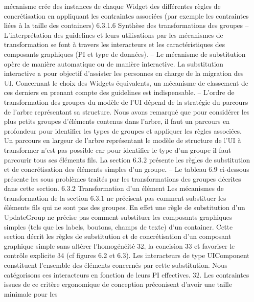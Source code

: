 \documentclass{article}
\begin{document}
m\'{e}canisme cr\'{e}e des instances de chaque Widget des diff\'{e}rentes r\`{e}gles de concr\'{e}tisation en appliquant
les contraintes associ\'{e}es (par exemple les contraintes li\'{e}es \`{a} la taille des containers)
6.3.1.6
Synth\`{e}se des transformations des groupes
– L’interpr\'{e}tation des guidelines et leurs utilisations par les m\'{e}canismes de transformation se
font \`{a} travers les interacteurs et les caract\'{e}ristiques des composants graphiques (PI et type de
donn\'{e}es).
– Le m\'{e}canisme de substitution op\`{e}re de mani\`{e}re automatique ou de mani\`{e}re interactive. La
substitution interactive a pour objectif d’assister les personnes en charge de la migration des
UI. Concernant le choix des Widgets \'{e}quivalents, un m\'{e}canisme de classement de ces derniers
en prenant compte des guidelines est indispensable.
– L’ordre de transformation des groupes du mod\`{e}le de l’UI d\'{e}pend de la strat\'{e}gie du parcours
de l’arbre repr\'{e}sentant sa structure. Nous avons remarqu\'{e} que pour consid\'{e}rer les plus petits
groupes d’\'{e}l\'{e}ments contenus dans l’arbre, il faut un parcours en profondeur pour identiﬁer les
types de groupes et appliquer les r\`{e}gles associ\'{e}es. Un parcours en largeur de l’arbre repr\'{e}sentant
le mod\`{e}le de structure de l’UI \`{a} transformer n’est pas possible car pour identiﬁer le type d’un
groupe il faut parcourir tous ses \'{e}l\'{e}ments ﬁls. La section 6.3.2 pr\'{e}sente les r\`{e}gles de substitution
et de concr\'{e}tisation des \'{e}l\'{e}ments simples d’un groupe.
– Le tableau 6.9 ci-dessous pr\'{e}sente les sous probl\`{e}mes trait\'{e}s par les transformations des groupes
d\'{e}crites dans cette section.
6.3.2
Transformation d’un \'{e}l\'{e}ment
Les m\'{e}canismes de transformation de la section 6.3.1 ne pr\'{e}cisent pas comment substituer les \'{e}l\'{e}ments ﬁls qui ne sont pas des groupes. En effet une r\`{e}gle de substitution d’un UpdateGroup ne pr\'{e}cise
pas comment substituer les composants graphiques simples (tels que les labels, boutons, champs de
texte) d’un container. Cette section d\'{e}crit les r\`{e}gles de substitution et de concr\'{e}tisation d’un composant graphique simple sans alt\'{e}rer l’homog\'{e}n\'{e}it\'{e} 32, la concision 33 et favoriser le contr\^{o}le explicite 34
(cf ﬁgures 6.2 et 6.3).
Les interacteurs de type UIComponent constituent l’ensemble des \'{e}l\'{e}ments concern\'{e}s par cette
substitution. Nous cat\'{e}gorisons ces interacteurs en fonction de leurs PI effectives.
32. Les contraintes issues de ce crit\`{e}re ergonomique de conception pr\'{e}conisent d’avoir une taille minimale pour les
\end{document}
